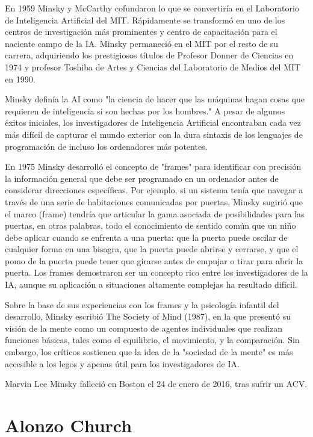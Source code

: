 \documentclass[letterpaper, 11pt]{article}
\begin{document}
\noindent En 1959 Minsky y McCarthy cofundaron lo que se convertiría en el Laboratorio de Inteligencia Artificial del MIT. Rápidamente se transformó en uno de los centros de investigación más prominentes y centro de capacitación para el naciente campo de la IA. Minsky permaneció en el MIT por el resto de su carrera, adquiriendo los prestigiosos títulos de Profesor Donner de Ciencias en 1974 y profesor Toshiba de Artes y Ciencias del Laboratorio de Medios del MIT en 1990.

\noindent Minsky definía la AI como "la ciencia de hacer que las máquinas hagan cosas que requieren de inteligencia si son hechas por los hombres." A pesar de algunos éxitos iniciales, los investigadores de Inteligencia Artificial encontraban cada vez más difícil de capturar el mundo exterior con la dura sintaxis de los lenguajes de programación de incluso los ordenadores más potentes. 

\noindent En 1975 Minsky desarrolló el concepto de "frames" para identificar con precisión la información general que debe ser programado en un ordenador antes de considerar direcciones específicas. Por ejemplo, si un sistema tenía que navegar a través de una serie de habitaciones comunicadas por puertas, Minsky sugirió que el marco (frame) tendría que articular la gama asociada de posibilidades para las puertas, en otras palabras, todo el conocimiento de sentido común que un niño debe aplicar cuando se enfrenta a una puerta: que la puerta puede oscilar de cualquier forma en una bisagra, que la puerta puede abrirse y cerrarse, y que el pomo de la puerta puede tener que girarse antes de empujar o tirar para abrir la puerta. Los frames demostraron ser un concepto rico entre los investigadores de la IA, aunque su aplicación a situaciones altamente complejas ha resultado difícil.

\noindent Sobre la base de sus experiencias con los frames y la psicología infantil del desarrollo, Minsky escribió The Society of Mind (1987), en la que presentó su visión de la mente como un compuesto de agentes individuales que realizan funciones básicas, tales como el equilibrio, el movimiento, y la comparación. Sin embargo, los críticos sostienen que la idea de la "sociedad de la mente" es más accesible a los legos y apenas útil para los investigadores de IA.

\noindent Marvin Lee Minsky falleció en Boston el 24 de enero de 2016, tras sufrir un ACV.
\newpage
\section*{Alonzo Church}
\end{document}

